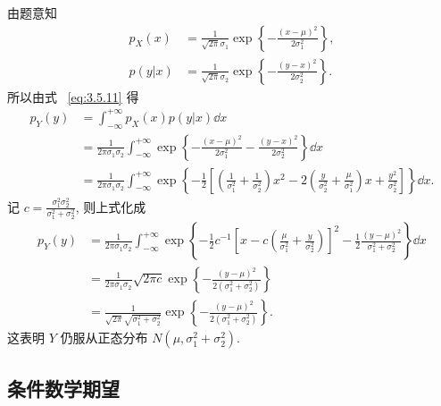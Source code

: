 	\begin{solution}
		由题意知
		\begin{align*}
			p_{X}(x)&=\frac{1}{\sqrt{2 \pi} \sigma_{1}} \exp \left\{-\frac{(x-\mu)^{2}}{2 \sigma_{1}^{2}}\right\}, \\
			p(y | x)&=\frac{1}{\sqrt{2 \pi} \sigma_{2}} \exp \left\{-\frac{(y-x)^{2}}{2 \sigma_{2}^{2}}\right\}.
		\end{align*}
		所以由式~ \eqref{eq:3.5.11} 得
		\begin{align*}
			p_{Y}(y) &=\int_{-\infty}^{+\infty} p_{X}(x) p(y | x) \dd x \\
			&=\frac{1}{2 \pi \sigma_{1} \sigma_{2}} \int_{-\infty}^{+\infty}\exp \left\{-\frac{(x-\mu)^{2} }
			{2 \sigma_{1}^{2}}-\frac{(y-x)^{2}}{2 \sigma_{2}^{2}}\right\} \dd x \\
			&=\frac{1}{2 \pi \sigma_{1} \sigma_{2}} \int_{-\infty}^{+\infty}
			\exp \left\{-\frac{1}{2}\left[\left(\frac{1}{\sigma_{1}^{2}}+\frac{1}{\sigma_{2}^{2}}\right) x^{2}-2\left(\frac{y}{\sigma_{2}^{2}}+\frac{\mu}{\sigma_{1}^{2}}\right) x+\frac{y^{2}}{\sigma_{2}^{2}}\right]\right\} \dd x .
		\end{align*}
		记 $c=\frac{\sigma_{1}^{2} \sigma_{2}^{2}}{\sigma_{1}^{2}+\sigma_{2}^{2}}$, 则上式化成
		\begin{align*}
			p_{Y}(y) &=\frac{1}{2 \pi \sigma_{1} \sigma_{2}} \int_{-\infty}^{+\infty} \exp \left\{-\frac{1}{2} c^{-1}\left[x-c\left(\frac{\mu}{\sigma_{1}^{2}}+\frac{y}{\sigma_{2}^{2}}\right)\right]^{2}-\frac{1}{2} \frac{(y-\mu)^{2}}{\sigma_{1}^{2}+\sigma_{2}^{2}}\right\} \dd x \\
			&=\frac{1}{2 \pi \sigma_{1} \sigma_{2}} \sqrt{2 \pi c} \exp \left\{-\frac{(y-\mu)^{2}}{2\left(\sigma_{1}^{2}+\sigma_{2}^{2}\right)}\right\}		\\
			&=\frac{1}{\sqrt{2 \pi} \sqrt{\sigma_{1}^{2}+\sigma_{2}^{2}}} \exp \left\{-\frac{(y-\mu)^{2}}{2\left(\sigma_{1}^{2}+\sigma_{2}^{2}\right)}\right\} .
		\end{align*}
		这表明 $Y$ 仍服从正态分布 $N(\mu,\sigma_1^2+\sigma_2^2)$.
	\end{solution}
	
	\subsection{条件数学期望}

